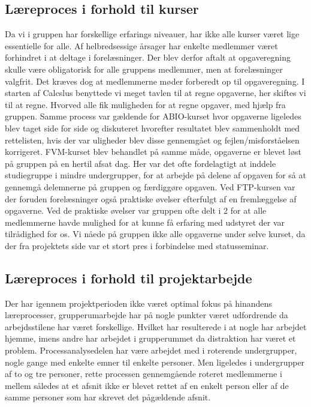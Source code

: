 \subsection{Læreproces i forhold til kurser}
Da vi i gruppen har forskellige erfarings niveauer, har ikke alle kurser været lige essentielle for alle. Af helbredsessige årsager har enkelte medlemmer været forhindret i at deltage i forelæsninger. Der blev derfor aftalt at opgaveregning skulle være obligatorisk for alle gruppens medlemmer, men at forelæsninger valgfrit. Det kræves dog at medlemmerne møder forberedt op til opgaveregning. I starten af Calcslus benyttede vi meget tavlen til at regne opgaverne, her skiftes vi til at regne. Hvorved alle fik muligheden for at regne opgaver, med hjælp fra gruppen. Samme process var gældende for ABIO-kurset hvor opgaverne ligeledes blev taget side for side og diskuteret hvorefter resultatet blev sammenholdt med rettelisten, hvis der var uligheder blev disse gennemgået og fejlen/misforståelsen korrigeret.
FVM-kurset blev behandlet på samme måde, opgaverne er blevet løst på gruppen på en hertil afsat dag. Her var det ofte fordelagtigt at inddele studiegruppe i mindre undergrupper, for at arbejde på delene af opgaven for så at gennemgå delemnerne på gruppen og færdiggøre opgaven. Ved FTP-kursen var der foruden forelæsninger også praktiske øvelser efterfulgt af en fremlæggelse af opgaverne. Ved de praktiske øvelser var gruppen ofte delt i 2 for at alle medlemmerne havde mulighed for at kunne få erfaring med udstyret der var tilrådighed for os. Vi nåede på gruppen ikke alle opgaverne under selve kurset, da der fra projektets side var et stort pres i forbindelse med statusseminar.  
\subsection{Læreproces i forhold til projektarbejde}
Der har igennem projektperioden ikke været optimal fokus på hinandens læreprocesser, grupperumarbejde har på nogle punkter været udfordrende da arbejdsstilene har været forskellige. Hvilket har resulterede i at nogle har arbejdet hjemme, imens andre har arbejdet i grupperummet da distraktion har været et problem. Processanalysedelen har være arbejdet med i roterende undergrupper, nogle gange med enkelte emner til enkelte personer. Men ligeledes i undergrupper af to og tre personer, rette processen gennemgående roteret medlemmerne i mellem således at et afsnit ikke er blevet rettet af en enkelt person eller af de samme personer som har skrevet det pågældende afsnit. 
\clearpage
